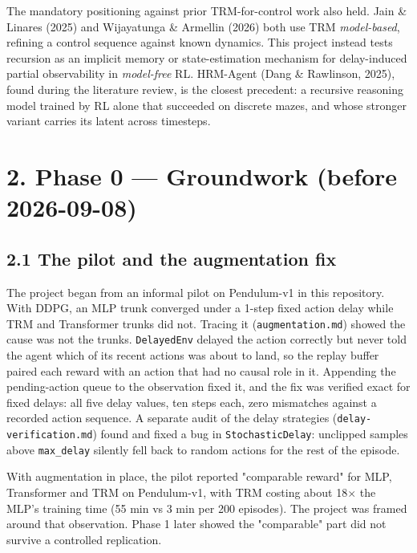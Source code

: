 \documentclass[11pt]{article}
\begin{document}
The mandatory positioning against prior TRM-for-control work also held. Jain \& Linares (2025) and Wijayatunga \& Armellin (2026) both use TRM \emph{model-based}, refining a control sequence against known dynamics. This project instead tests recursion as an implicit memory or state-estimation mechanism for delay-induced partial observability in \emph{model-free} RL. HRM-Agent (Dang \& Rawlinson, 2025), found during the literature review, is the closest precedent: a recursive reasoning model trained by RL alone that succeeded on discrete mazes, and whose stronger variant carries its latent across timesteps.



\medskip



\section*{2. Phase 0 --- Groundwork (before 2026-09-08)}



\subsection*{2.1 The pilot and the augmentation fix}



The project began from an informal pilot on Pendulum-v1 in this repository. With DDPG, an MLP trunk converged under a 1-step fixed action delay while TRM and Transformer trunks did not. Tracing it (\texttt{augmentation.\allowbreak{}md}) showed the cause was not the trunks. \texttt{DelayedEnv} delayed the action correctly but never told the agent which of its recent actions was about to land, so the replay buffer paired each reward with an action that had no causal role in it. Appending the pending-action queue to the observation fixed it, and the fix was verified exact for fixed delays: all five delay values, ten steps each, zero mismatches against a recorded action sequence. A separate audit of the delay strategies (\texttt{delay-verification.\allowbreak{}md}) found and fixed a bug in \texttt{StochasticDelay}: unclipped samples above \texttt{max\_delay} silently fell back to random actions for the rest of the episode.



With augmentation in place, the pilot reported "comparable reward" for MLP, Transformer and TRM on Pendulum-v1, with TRM costing about 18$\times$ the MLP's training time (55 min vs 3 min per 200 episodes). The project was framed around that observation. Phase 1 later showed the "comparable" part did not survive a controlled replication.
\end{document}
